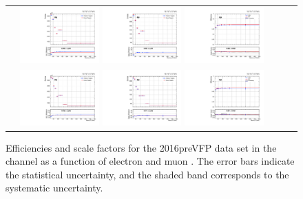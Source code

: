 \begin{figure}[htb]
  \begin{center}
    \begin{tabular}{ccc}
      \includegraphics[width=0.30\textwidth]{fig_2016preVFP_TrigSF/g_lepApt_emu_MC.pdf}
      \includegraphics[width=0.30\textwidth]{fig_2016preVFP_TrigSF/g_lepApt_emu_data.pdf}
      \includegraphics[width=0.30\textwidth]{fig_2016preVFP_TrigSF/g_emu_lepApt_FullSystUncBand.pdf}\\
      \includegraphics[width=0.30\textwidth]{fig_2016preVFP_TrigSF/g_lepBpt_emu_MC.pdf}
      \includegraphics[width=0.30\textwidth]{fig_2016preVFP_TrigSF/g_lepBpt_emu_data.pdf}
      \includegraphics[width=0.30\textwidth]{fig_2016preVFP_TrigSF/g_emu_lepBpt_FullSystUncBand.pdf}\\
    \end{tabular}
    \caption{Efficiencies and scale factors for the 2016preVFP data set in the \emu channel as a function of electron and muon \pT.
            The error bars indicate the statistical uncertainty, and the shaded band corresponds to the systematic uncertainty.
            }
    \label{TrigSF_2016preVFP_1}
  \end{center}
\end{figure}


